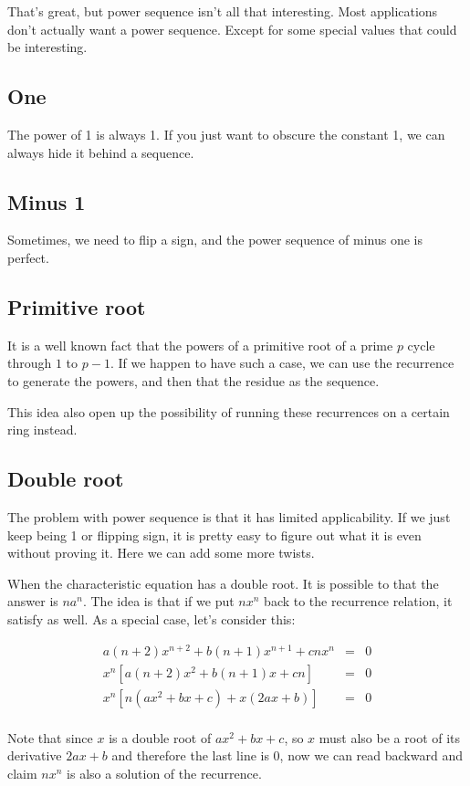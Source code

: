 \documentclass{article}
\begin{document}
That's great, but power sequence isn't all that interesting. Most applications don't actually want a power sequence. Except for some special values that could be interesting.

\subsection*{One}
The power of 1 is always 1. If you just want to obscure the constant 1, we can always hide it behind a sequence.

\subsection*{Minus 1}
Sometimes, we need to flip a sign, and the power sequence of minus one is perfect.

\subsection*{Primitive root}
It is a well known fact that the powers of a primitive root of a prime $ p $ cycle through $ 1 $ to $ p - 1$. If we happen to have such a case, we can use the recurrence to generate the powers, and then that the residue as the sequence.

This idea also open up the possibility of running these recurrences on a certain ring instead.

\subsection*{Double root}
The problem with power sequence is that it has limited applicability. If we just keep being 1 or flipping sign, it is pretty easy to figure out what it is even without proving it. Here we can add some more twists.

When the characteristic equation has a double root. It is possible to that the answer is $ na^n $. The idea is that if we put $ nx^n $ back to the recurrence relation, it satisfy as well. As a special case, let's consider this:

\begin{eqnarray*}
  a(n+2)x^{n+2} + b(n+1)x^{n+1} + cnx^n &=& 0 \\
  x^n[a(n+2)x^2 + b(n+1)x + cn] &=& 0 \\
  x^n[n(ax^2 + bx + c) + x(2ax + b)] &=& 0 \\
\end{eqnarray*}

Note that since $ x $ is a double root of $ ax^2 + bx + c $, so $ x $ must also be a root of its derivative $ 2ax + b $ and therefore the last line is 0, now we can read backward and claim $ nx^n $ is also a solution of the recurrence.
\end{document}
